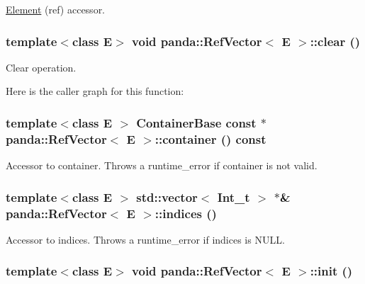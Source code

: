 \hyperlink{classpanda_1_1Element}{Element} (ref) accessor. \hypertarget{classpanda_1_1RefVector_a15c08504ee8d0bbf2bbd514893b89fe6}{
\subsubsection[{clear}]{\setlength{\rightskip}{0pt plus 5cm}template$<$class E$>$ void {\bf panda::RefVector}$<$ E $>$::clear ()}}
\label{classpanda_1_1RefVector_a15c08504ee8d0bbf2bbd514893b89fe6}


Clear operation. 

Here is the caller graph for this function:\hypertarget{classpanda_1_1RefVector_aa256cff6aa9fc74451ebf1575c63c0a4}{
\subsubsection[{container}]{\setlength{\rightskip}{0pt plus 5cm}template$<$class E $>$ {\bf ContainerBase} const $\ast$ {\bf panda::RefVector}$<$ E $>$::container () const}}
\label{classpanda_1_1RefVector_aa256cff6aa9fc74451ebf1575c63c0a4}


Accessor to container. Throws a runtime\_\-error if container is not valid. \hypertarget{classpanda_1_1RefVector_a50a990104f945e9c2981e681083dc95f}{
\subsubsection[{indices}]{\setlength{\rightskip}{0pt plus 5cm}template$<$class E $>$ std::vector$<$ Int\_\-t $>$ $\ast$\& {\bf panda::RefVector}$<$ E $>$::indices ()}}
\label{classpanda_1_1RefVector_a50a990104f945e9c2981e681083dc95f}


Accessor to indices. Throws a runtime\_\-error if indices is NULL. \hypertarget{classpanda_1_1RefVector_adf498e038158f31128bb0efb399041cd}{
\subsubsection[{init}]{\setlength{\rightskip}{0pt plus 5cm}template$<$class E$>$ void {\bf panda::RefVector}$<$ E $>$::init ()}}
\label{classpanda_1_1RefVector_adf498e038158f31128bb0efb399041cd}


